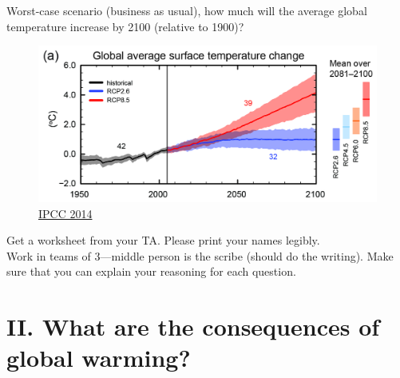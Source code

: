 \begin{frame}[t]
    \begin{adjustwidth}{-2em}{-1.5em}
    \vspace{-3mm}
    Worst-case scenario (business as usual), how much will the average global
    temperature increase by 2100 (relative to 1900)? 

    \begin{figure}
        \begin{center}
            \includegraphics[width=1.0\linewidth]{../images/ipcc-ar5-wg1-temp-predictions.jpg}
            \caption{\href{http://www.ipcc.ch/report/ar5/syr/}{IPCC 2014}}
        \end{center}
    \end{figure}

    \vspace{-3mm}
    \end{adjustwidth}
\end{frame}
    
\begin{frame}
    Get a worksheet from your TA. Please print your names legibly. \\

    \vspace{1cm}
    Work in teams of 3---middle person is the scribe (should do the writing).
    Make sure that you can explain your reasoning for each question. 
\end{frame}

\section{II. What are the consequences of global warming?}

